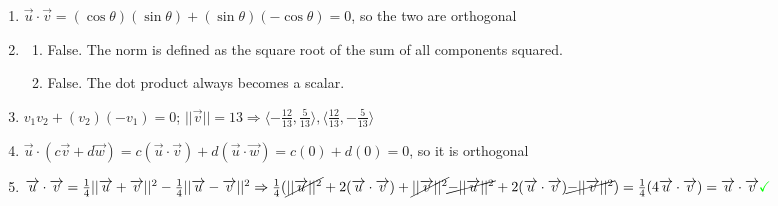 \documentclass[12pt]{article}
\begin{document}
\begin{enumerate}
\begin{enumerate}
    \end{enumerate}

    \setcounter{enumi}{70}

  \item $\overrightarrow{u}\cdot\overrightarrow{v}=(\cos\theta)(\sin\theta)+(\sin\theta)(-\cos\theta)=0$, so the two are orthogonal

    \setcounter{enumi}{72}

  \item

    \begin{enumerate}

      \item False. The norm is defined as the square root of the sum of all components squared.

      \item False. The dot product always becomes a scalar.

    \end{enumerate}

    \setcounter{enumi}{76}

  \item $v_1v_2+(v_2)(-v_1)=0$; $||\overrightarrow{v}||=13\Rightarrow\langle-\frac{12}{13},\frac{5}{13}\rangle,\langle\frac{12}{13},-\frac{5}{13}\rangle$

    \setcounter{enumi}{82}

  \item $\overrightarrow{u}\cdot(c\overrightarrow{v}+d\overrightarrow{w})=c(\overrightarrow{u}\cdot\overrightarrow{v})+d(\overrightarrow{u}\cdot\overrightarrow{w})=c(0)+d(0)=0$, so it is orthogonal

  \item $\overrightarrow{u}\cdot\overrightarrow{v}=\frac{1}{4}||\overrightarrow{u}+\overrightarrow{v}||^2-\frac{1}{4}||\overrightarrow{u}-\overrightarrow{v}||^2\Rightarrow \frac{1}{4}(\cancel{||\overrightarrow{u}||^2}+2(\overrightarrow{u}\cdot\overrightarrow{v})+\cancel{||\overrightarrow{v}||^2}\cancel{-||\overrightarrow{u}||^2}+2(\overrightarrow{u}\cdot\overrightarrow{v})\cancel{-||\overrightarrow{v}||^2})=\frac{1}{4}(4\overrightarrow{u}\cdot\overrightarrow{v})=\overrightarrow{u}\cdot\overrightarrow{v}\textcolor{green}{\checkmark}$

\end{enumerate}
\end{document}

